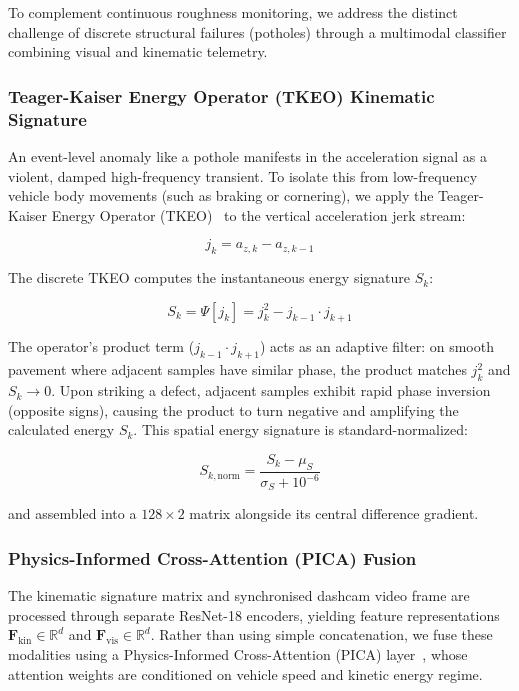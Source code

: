 \documentclass[conference]{IEEEtran}
\begin{document}
To complement continuous roughness monitoring, we address the distinct challenge of discrete structural failures (potholes) through a multimodal classifier combining visual and kinematic telemetry.

\subsubsection{Teager-Kaiser Energy Operator (TKEO) Kinematic Signature}
An event-level anomaly like a pothole manifests in the acceleration signal as a violent, damped high-frequency transient.
To isolate this from low-frequency vehicle body movements (such as braking or cornering), we apply the Teager-Kaiser Energy Operator (TKEO)~\cite{kaiser1990tkeo} to the vertical acceleration jerk stream:

\begin{equation}
\label{eq:jerk}
j_k = a_{z,k} - a_{z,k-1}
\end{equation}

The discrete TKEO computes the instantaneous energy signature $S_k$:

\begin{equation}
\label{eq:tkeo}
S_k = \Psi[j_k] = j_k^2 - j_{k-1} \cdot j_{k+1}
\end{equation}

The operator's product term ($j_{k-1} \cdot j_{k+1}$) acts as an adaptive filter: on smooth pavement where adjacent samples have similar phase, the product matches $j_k^2$ and $S_k \to 0$.
Upon striking a defect, adjacent samples exhibit rapid phase inversion (opposite signs), causing the product to turn negative and amplifying the calculated energy $S_k$.
This spatial energy signature is standard-normalized:

\begin{equation}
\label{eq:tkeo_norm}
S_{k,\text{norm}} = \frac{S_k - \mu_S}{\sigma_S + 10^{-6}}
\end{equation}

and assembled into a $128 \times 2$ matrix alongside its central difference gradient.

\subsubsection{Physics-Informed Cross-Attention (PICA) Fusion}
The kinematic signature matrix and synchronised dashcam video frame are processed through separate ResNet-18 encoders, yielding feature representations $\mathbf{F}_{\text{kin}} \in \mathbb{R}^{d}$ and $\mathbf{F}_{\text{vis}} \in \mathbb{R}^{d}$.
Rather than using simple concatenation, we fuse these modalities using a Physics-Informed Cross-Attention (PICA) layer~\cite{vaswani2017attention}, whose attention weights are conditioned on vehicle speed and kinetic energy regime.
\end{document}
